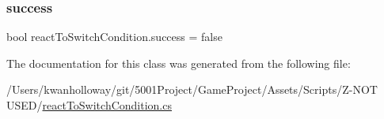 \subsubsection{\texorpdfstring{success}{success}}
{\footnotesize\ttfamily bool react\+To\+Switch\+Condition.\+success = false}



The documentation for this class was generated from the following file\+:\begin{DoxyCompactItemize}
\item 
/\+Users/kwanholloway/git/5001\+Project/\+Game\+Project/\+Assets/\+Scripts/\+Z-\/\+N\+O\+T U\+S\+E\+D/\hyperlink{react_to_switch_condition_8cs}{react\+To\+Switch\+Condition.\+cs}\end{DoxyCompactItemize}
